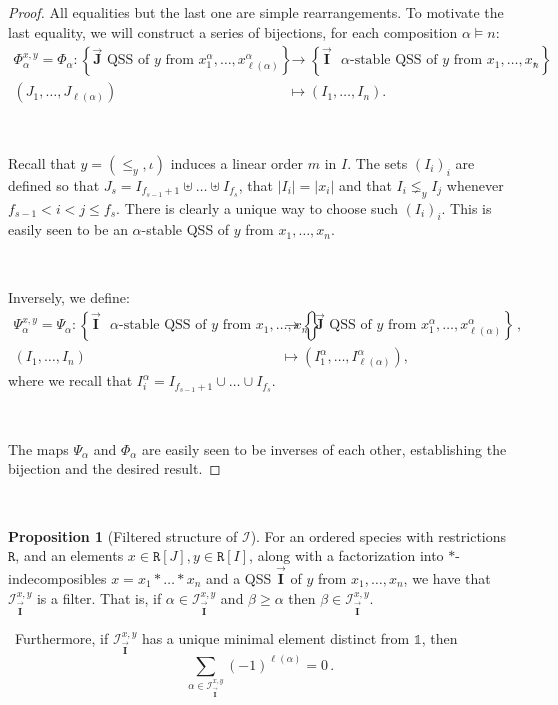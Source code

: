 \documentclass[12pt, reqno]{amsart}
\theoremstyle{definition}
\newtheorem{prop}[thm]{Proposition}
\newtheorem{smpl}[thm]{Example}
\newcommand{\III}{\vec{\mathbf{I}}}
\newcommand{\JJJ}{\vec{\mathbf{J}}}
\DeclareMathOperator{\pat}{\mathbf{pat}}
\begin{document}
\begin{proof}
All equalities but the last one are simple rearrangements.
To motivate the last equality, we will construct a series of bijections, for each composition $\alpha \models n$:
\begin{align*}
    \Phi_{\alpha}^{x, y} = \Phi_{\alpha} : \left\{ \JJJ \text{ QSS of $y$ from $x^{\alpha}_1, \dots, x^{\alpha}_{\ell(\alpha)}$}\right\} &\to \left\{ \III \text{ $\alpha$-stable QSS of $y$ from $x_1, \dots, x_n$}\right\}\, , \\
    (J_1, \dots, J_{\ell(\alpha)} ) &\mapsto (I_1, \dots , I_n).
\end{align*}

\

Recall that $y = (\leq_y, \iota)$ induces a linear order $m$ in $I$.
The sets $(I_i)_i$ are defined so that $J_s = I_{f_{s-1}+1} \uplus \dots \uplus I_{f_s}$, that $|I_i | = |x_i|$ and that $I_i \lneq_y I_j $ whenever $f_{s-1} < i < j \leq f_{s}$.
There is clearly a unique way to choose such $(I_i)_i$.
This is easily seen to be an $\alpha$-stable QSS of $y$ from $x_1, \dots, x_n$.

\

Inversely, we define:
\begin{align*}
    \Psi_{\alpha}^{x, y} = \Psi_{\alpha}  : \left\{ \III \text{ $\alpha$-stable QSS of $y$ from $x_1, \dots, x_n$}\right\} &\to \left\{ \JJJ \text{ QSS of $y$ from $x^{\alpha}_1, \dots, x^{\alpha}_{\ell(\alpha)}$}\right\} \, , \\
    (I_1, \dots , I_n) &\mapsto (I_1^{\alpha}, \dots, I^{\alpha}_{\ell(\alpha)} ),
\end{align*}
where we recall that $I^{\alpha}_i = I_{f_{s-1}+1} \cup \dots  \cup I_{f_s}$.

\

The maps $\Psi_{\alpha}$ and $\Phi_{\alpha}$ are easily seen to be inverses of each other, establishing the bijection and the desired result.
\end{proof}

\

%

\begin{prop}[Filtered structure of $\mathcal I$]\label{prop:filter_structure_I}
For an ordered species with restrictions $\mathtt{R}$, and an elements $x\in  \mathtt{R}[J], y\in \mathtt{R}[I]$, along with a factorization into $\ast$-indecomposibles $x = x_1 \ast \dots \ast x_n$ and a QSS $\III$ of $y$ from $x_1, \dots, x_n$, we have that $\mathcal I^{ x, y}_{\III}$ is a filter.
That is, if $\alpha \in \mathcal I^{ x, y}_{\III}$ and $\beta \geq \alpha$ then $\beta \in \mathcal I^{ x, y}_{\III}$.

\
Furthermore, if $\mathcal I^{ x, y}_{\III}$ has a unique minimal element distinct from $\mathbb{1}$, then
$$\sum_{\alpha \in \mathcal I^{x, y}_{\III}} (-1)^{\ell(\alpha)} = 0 \, .$$
\end{prop}
\end{document}
